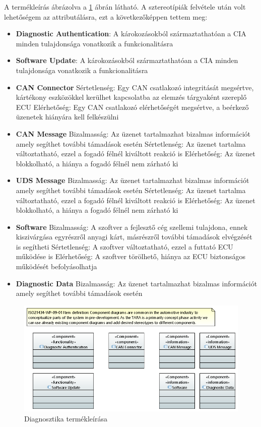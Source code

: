 A termékleírás ábrázolva a \ref{fig:item_def} ábrán látható. A sztereotípiák felvétele után volt lehetőségem az attributálásra, ezt a következőképpen tettem meg:
\begin{itemize}
	\item \textbf{Diagnostic Authentication}: A károkozásokból származtathatóan a CIA minden tulajdonsága vonatkozik a funkcionalitásra
	\item \textbf{Software Update}: A károkozásokból származtathatóan a CIA minden tulajdonsága vonatkozik a funkcionalitásra
	\item \textbf{CAN Connector}
	\subitem Sértetlenség: Egy CAN csatlakozó integritását megsértve, kártékony eszközökkel kerülhet kapcsolatba az elemzés tárgyaként szereplő ECU
	\subitem Elérhetőség: Egy CAN csatlakozó elérhetőségét megsértve, a beérkező üzenetek hiányára kell felkészülni
	\item \textbf{CAN Message}
	\subitem Bizalmasság: Az üzenet tartalmazhat bizalmas információt amely segíthet további támadások esetén
	\subitem Sértetlenség: Az üzenet tartalma változtatható, ezzel a fogadó félnél kiváltott reakció is
	\subitem Elérhetőség: Az üzenet blokkolható, a hiánya a fogadó félnél nem zárható ki
	\item \textbf{UDS Message}
	\subitem Bizalmasság: Az üzenet tartalmazhat bizalmas információt amely segíthet további támadások esetén
	\subitem Sértetlenség: Az üzenet tartalma változtatható, ezzel a fogadó félnél kiváltott reakció is
	\subitem Elérhetőség: Az üzenet blokkolható, a hiánya a fogadó félnél nem zárható ki
	\item \textbf{Software}
	\subitem Bizalmasság: A szoftver a fejlesztő cég szellemi tulajdona, ennek kiszivárgása egyrészről anyagi kárt, másrészről további támadások elvégzését is segítheti
	\subitem Sértetlenség: A szoftver változtatható, ezzel a futtató ECU működése is
	\subitem Elérhetőség: A szoftver törölhető, hiánya az ECU biztonságos működését befolyásolhatja
	\item \textbf{Diagnostic Data}
	\subitem Bizalmasság: Az üzenet tartalmazhat bizalmas információt amely segíthet további támadások esetén
\end{itemize}

\begin{figure}[!ht]
	\centering
	\includegraphics[width=120mm, keepaspectratio]{figures/06_02_item_definition_diagram.PNG}
	\caption{Diagnosztika termékleírása}
	\label{fig:item_def}
\end{figure}

